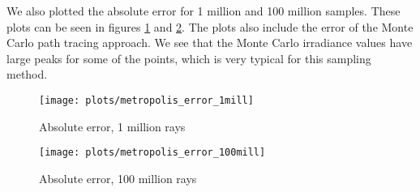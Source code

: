 We also plotted the absolute error for 1 million and 100 million samples. These plots can be seen in figures \ref{fig:metropolis_error1} and \ref{fig:metropolis_error100}. The plots also include the error of the Monte Carlo path tracing approach. We see that the Monte Carlo irradiance values have large peaks for some of the points, which is very typical for this sampling method.

\begin{figure}
    \centering
    \texttt{[image: plots/metropolis\_error\_1mill]}\\
    \caption{Absolute error, 1 million rays}
    \label{fig:metropolis_error1}
\end{figure}

\begin{figure}
    \centering
    \texttt{[image: plots/metropolis\_error\_100mill]}\\
    \caption{Absolute error, 100 million rays}
    \label{fig:metropolis_error100}
\end{figure}
